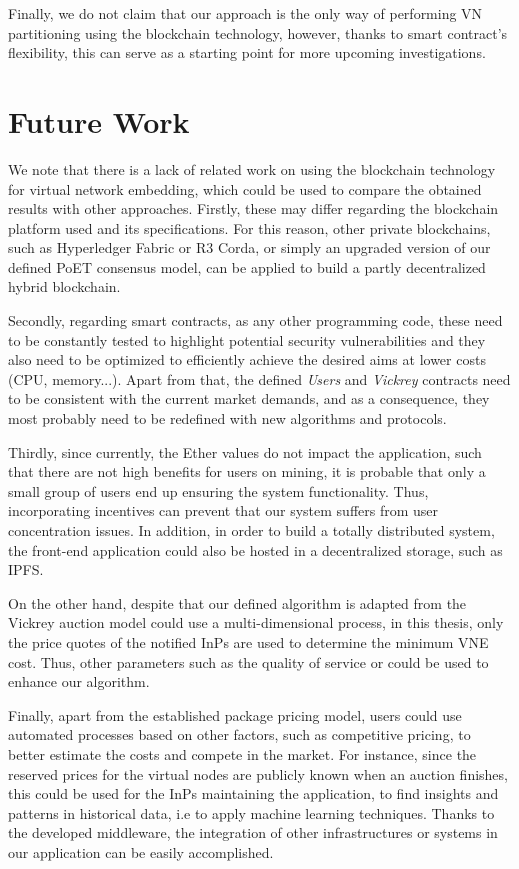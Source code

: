 Finally, we do not claim that our approach is the only way of performing VN partitioning using the blockchain technology, however,  thanks to smart contract's flexibility, this can serve as a starting point for more upcoming investigations.

\section{Future Work}

We note that there is a lack of related work on using the blockchain technology for virtual network embedding, which could be used to compare the obtained results with other approaches. Firstly, these may differ regarding the blockchain platform used and its specifications. For this reason, other private blockchains, such as Hyperledger Fabric or R3 Corda, or simply an upgraded version of our defined PoET consensus model, can be applied to build a partly decentralized hybrid blockchain.

Secondly, regarding smart contracts, as any other programming code, these need to be constantly tested to highlight potential security vulnerabilities and they also need to be optimized to efficiently achieve the desired aims at lower costs (CPU, memory...). Apart from that, the defined \textit{Users} and \textit{Vickrey} contracts need to be consistent with the current market demands, and as a consequence, they most probably need to be redefined with new algorithms and protocols.

Thirdly, since currently, the Ether values do not impact the application, such that there are not high benefits for users on mining, it is probable that only a small group of users end up ensuring the system functionality. Thus, incorporating incentives can prevent that our system suffers from user concentration issues. In addition, in order to build a totally distributed system, the front-end application could also be hosted in a decentralized storage, such as IPFS. 

On the other hand, despite that our defined algorithm is adapted from the Vickrey auction model could use a multi-dimensional process, in this thesis, only the price quotes of the notified InPs are used to determine the minimum VNE cost. Thus, other parameters such as the quality of service or could be used to enhance our algorithm.

Finally, apart from the established package pricing model, users could use automated processes based on other factors, such as competitive pricing, to better estimate the costs and compete in the market. For instance, since the reserved prices for the virtual nodes are publicly known when an auction finishes, this could be used for the InPs maintaining the application, to find insights and patterns in historical data, i.e to apply machine learning techniques. Thanks to the developed middleware, the integration of other infrastructures or systems in our application can be easily accomplished.
 
